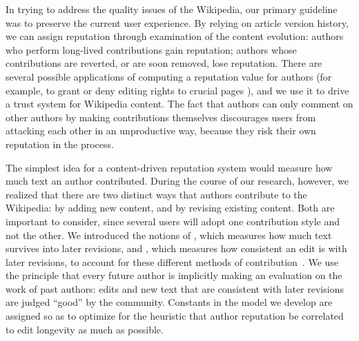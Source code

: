 
In trying to address the quality issues of the Wikipedia,
our primary guideline was to preserve the current user experience.
By relying on article version history, we can assign reputation
through examination of the content evolution:
authors who perform long-lived contributions gain reputation; authors
whose contributions are reverted, or are soon removed, lose reputation.
There are several possible applications of computing a reputation
value for authors (for example, to grant or deny editing rights to
crucial pages \cite{Blaze96}), and we use it to drive a trust system for
Wikipedia content.
The fact that authors can only comment on other authors by
making contributions themselves discourages users from attacking
each other in an unproductive way, because they risk their own reputation in the process.


The simplest idea for a content-driven reputation system would measure
how much text an author contributed.
During the course of our research, however, we realized that there are
two distinct ways that authors contribute to the Wikipedia: by adding
new content, and by revising existing content.
Both are important to consider, since several users will
adopt one contribution style and not the other.
We introduced the notions of
, which measures how much text survives
into later revisions, and , which measures
how consistent an edit is with later revisions,
to account for these different methods of contribution~\cite{Adler2007}.
We use the principle that every future author is
implicitly making an evaluation on the work of past authors:
edits and new text that are consistent with later revisions
are judged ``good'' by the community.
Constants in the model we develop are assigned so as to optimize
for the heuristic that author reputation
be correlated to edit longevity as much as possible.

